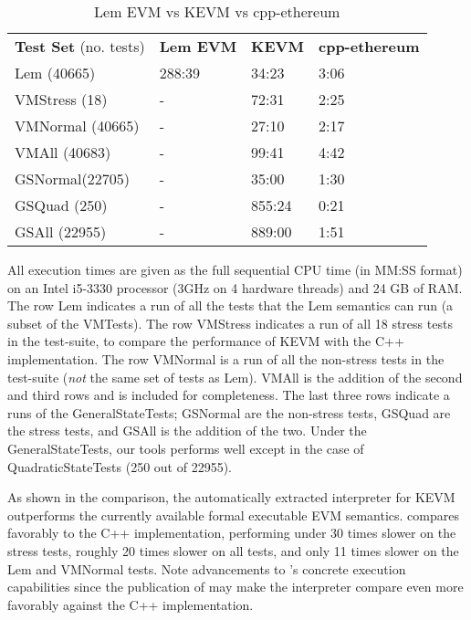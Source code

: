 \begin{table}[h]
    \centering
      \begin{tabular}{ l l l l }
          \textbf{Test Set} (no. tests) & \textbf{Lem EVM} & \textbf{KEVM} & \textbf{cpp-ethereum} \\
          Lem (40665)                   & 288:39           & 34:23         & 3:06                  \\
          VMStress (18)                 & -                & 72:31         & 2:25                  \\
          VMNormal (40665)              & -                & 27:10         & 2:17                  \\
          VMAll (40683)                 & -                & 99:41         & 4:42                  \\
          GSNormal(22705)               & -                & 35:00         & 1:30                  \\
          GSQuad (250)                  & -                & 855:24        & 0:21                  \\
          GSAll (22955)                 & -                & 889:00        & 1:51                  \\
      \end{tabular}
  \caption{Lem EVM vs KEVM vs cpp-ethereum} \label{table:kevm-perf}
\end{table}


All execution times are given as the full sequential CPU time (in MM:SS format)
  on an Intel i5-3330 processor (3GHz on 4 hardware threads) and 24 GB of RAM.
The row Lem indicates a run of all the tests that the Lem semantics
can run (a subset of the VMTests).
The row VMStress indicates a run of all 18 stress tests in the test-suite,
    to compare the performance of KEVM with the C++ implementation.
The row VMNormal is a run of all the non-stress
tests in the test-suite (\textit{not} the same set of tests as Lem).
VMAll is the addition of the second and third rows and is included for completeness.
The last three rows indicate a runs of the GeneralStateTests;
GSNormal are the non-stress tests, GSQuad are the stress tests,
         and GSAll is the addition of the two.
Under the GeneralStateTests, our tools performs well except
in the case of QuadraticStateTests (250 out of 22955).

As shown in the comparison,
   the automatically extracted interpreter for KEVM outperforms
   the currently available formal executable EVM semantics.
\KEVM{} compares favorably to the C++ implementation,
     performing under 30 times slower on the stress tests,
     roughly 20 times slower on all tests, and
     only 11 times slower on the Lem and VMNormal tests. Note
     advancements to \K's concrete execution capabilities since
     the publication of \cite{HildenbrandtCSF18} may
     make the \KEVM{} interpreter compare even more favorably against the
     C++ implementation.

